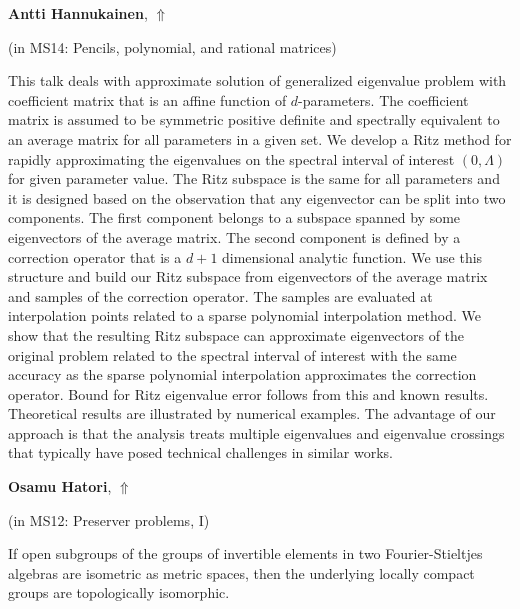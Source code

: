 \documentclass[ILAS2025-program.tex]{subfiles}
\begin{document}
\hypertarget{down0329}{}\begin{ilasabstract}
    
\textbf{Antti Hannukainen},  \hfill \hyperlink{up0329}{$\Uparrow$}
    
    
(in {\color{mstitle}MS14: Pencils, polynomial, and rational matrices})
        
\mtskip
    This talk deals with approximate solution of generalized eigenvalue problem with coefficient matrix that is an affine function of $d$-parameters. The coefficient matrix is assumed to be symmetric positive definite and spectrally equivalent to an average matrix for all parameters in a given set. We develop a Ritz method for rapidly approximating the eigenvalues on the spectral interval of interest $(0,\Lambda)$ for given parameter value. The Ritz subspace is the same for all parameters and it is designed based on the observation that any eigenvector can be split into two components. The first component belongs to a subspace spanned by some eigenvectors of the average matrix. The second component is defined by a correction operator that is a $d+1$ dimensional analytic function. We use this structure and build our Ritz subspace from eigenvectors of the average matrix and samples of the correction operator. The samples are evaluated at interpolation points related to a sparse polynomial interpolation method. We show that the resulting Ritz subspace can approximate eigenvectors of the original problem related to the spectral interval of interest with the same accuracy as the sparse polynomial interpolation approximates the correction operator. Bound for Ritz eigenvalue error follows from this and known results. Theoretical results are illustrated by numerical examples. The advantage of our approach is that the analysis treats multiple eigenvalues and eigenvalue crossings that typically have posed technical challenges in similar works.

\end{ilasabstract}
    

\hypertarget{down0128}{}\begin{ilasabstract}
    
\textbf{Osamu Hatori},  \hfill \hyperlink{up0128}{$\Uparrow$}
    
    
(in {\color{mstitle}MS12: Preserver problems, I})
        
\mtskip
    If open subgroups of the groups of invertible elements in two Fourier-Stieltjes algebras are isometric as metric spaces, then the underlying locally compact groups are topologically isomorphic.

\end{ilasabstract}
    
\end{document}
